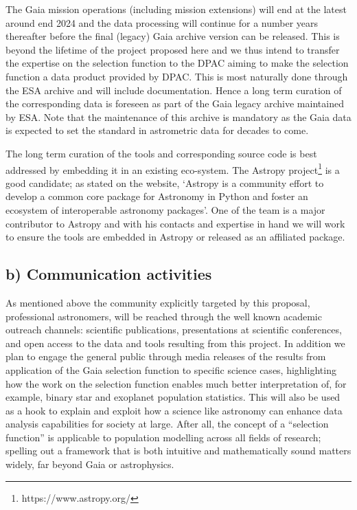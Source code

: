 The Gaia mission operations (including mission extensions) will end at the latest around end 2024 and the data processing will continue for a number years thereafter before the final (legacy) Gaia archive version can be released. This is beyond the lifetime of the project proposed here and we thus intend to transfer the expertise on the selection function to the DPAC aiming to make the selection function a data product provided by DPAC. This is most naturally done through the ESA archive and will include documentation. Hence a long term curation of the corresponding data is foreseen as part of the Gaia legacy archive maintained by ESA. Note that the maintenance of this archive is mandatory as the Gaia data is expected to set the standard in astrometric data for decades to come. 

The long term curation of the {\acro} tools and corresponding source code is best addressed by embedding it in an existing eco-system. The Astropy project\footnote{https://www.astropy.org/} is a good candidate; as stated on the website, `Astropy is a community effort to develop a common core package for Astronomy in Python and foster an ecosystem of interoperable astronomy packages'. One of the {\acro} team is a major contributor to Astropy and with his contacts and expertise in hand we will work to ensure the {\acro} tools are embedded in Astropy or released as an affiliated package.

\subsection{b) Communication activities}
\label{sec:communication-activities}

As mentioned above the community explicitly targeted by this proposal, professional astronomers, will be reached through the well known academic outreach channels: scientific publications, presentations at scientific conferences, and open access to the data and tools resulting from this project. In addition we plan to engage the general public through media releases of the results from application of the Gaia selection function to specific science cases, highlighting how the work on the selection function enables much better interpretation of, for example, binary star and exoplanet population statistics. This will also be used as a hook to explain and exploit how a science like astronomy can enhance data analysis capabilities for society at large. After all, the concept of a ``selection function'' is applicable to population modelling across all fields of research; spelling out a framework that is both intuitive and mathematically sound matters widely, far beyond Gaia or astrophysics.
